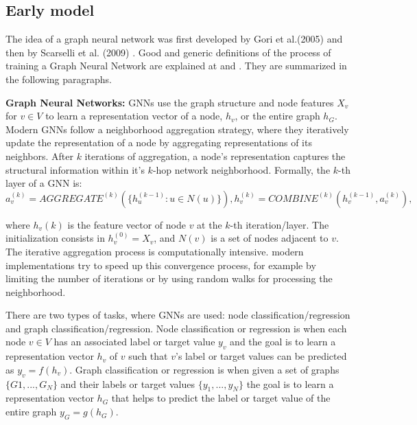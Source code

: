 \subsection{Early model}


The idea of a graph neural network was first developed by Gori et al.(2005) \cite{gori} and then by Scarselli et al. (2009) \cite{scarcelli}. Good and generic definitions of the process of training a Graph Neural Network are explained at \cite{hamilton} and \cite{powerful}. They are summarized in the following paragraphs. 

\textbf{Graph Neural Networks:} GNNs use the graph structure and node features $X_v$ for $v \in V$ to learn a representation vector of a node, $h_v$, or the entire graph $h_{G}$. Modern GNNs follow a neighborhood aggregation strategy, where they iteratively update the representation of a node by aggregating representations of its neighbors. After $k$ iterations of aggregation, a node's representation captures the structural information within it's $k$-hop network neighborhood. Formally, the $k$-th layer of a GNN is:
$$ a_v^{(k)} = AGGREGATE^{(k)}(\{ h_u^{(k-1)} : u \in N(u) \}) , h_v^{(k)} = COMBINE^{(k)}(h_v^{(k-1)}, a_v^{(k)}),$$

where $h_v(k)$ is the feature vector of node $v$ at the $k$-th iteration/layer. The initialization consists in $h_v^{(0)} = X_v$, and $N(v)$ is a set of nodes adjacent to $v$. 
The iterative aggregation process is computationally intensive. modern implementations try to speed up this convergence process, for example by limiting the number of iterations or by using random walks for processing the neighborhood.

There are two types of tasks, where GNNs are used: node classification/regression and graph classification/regression.  Node classification or regression is when each node $v \in V$ has an associated label or target value $y_v$ and the goal is to learn a representation vector $h_v$ of $v$ such that $v$'s label or target values can be predicted as $y_v=f(h_v)$. Graph classification or regression is when given a set of graphs $\{ G1, ..., G_N\}$ and their labels or target values $\{y_1,...,y_N\}$ the goal is to learn a representation vector $h_G$ that helps to predict the label or target value of the entire graph $y_G=g(h_G)$.

